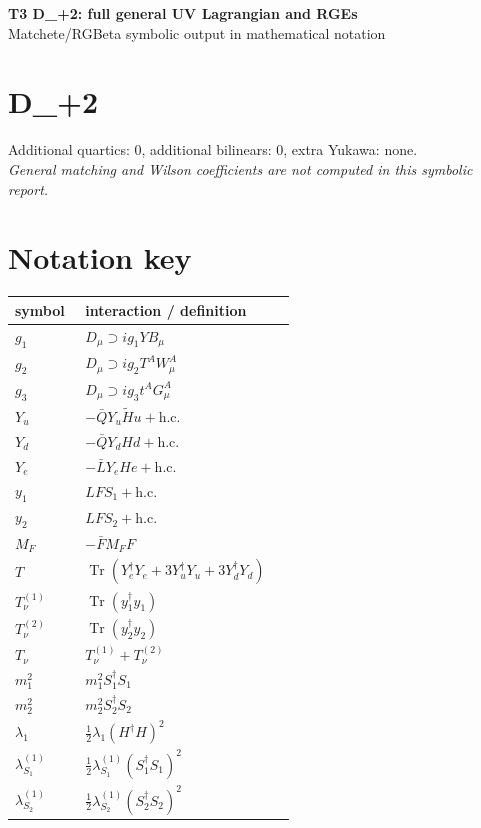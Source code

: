 \documentclass[10pt,a4paper]{article}
\begin{document}
\begin{center}
{\Large\bfseries T3 D\_+2: full general UV Lagrangian and RGEs}\\[4pt]
Matchete/RGBeta symbolic output in mathematical notation
\end{center}
\bigskip
\section*{D\_+2}
Additional quartics: 0, additional bilinears: 0, extra Yukawa: none.\\
\emph{General matching and Wilson coefficients are not computed in this symbolic report.}
\section*{Notation key}
\begin{longtable}{@{}p{0.23\linewidth}p{0.69\linewidth}@{}}
\toprule
symbol & interaction / definition \\
\midrule
$g_1$ & $D_\mu\supset i g_1YB_\mu$ \\
$g_2$ & $D_\mu\supset i g_2T^AW_\mu^A$ \\
$g_3$ & $D_\mu\supset i g_3t^AG_\mu^A$ \\
$Y_u$ & $-\bar QY_u\widetilde Hu+\mathrm{h.c.}$ \\
$Y_d$ & $-\bar QY_dHd+\mathrm{h.c.}$ \\
$Y_e$ & $-\bar LY_eHe+\mathrm{h.c.}$ \\
$y_1$ & $LFS_1+\mathrm{h.c.}$ \\
$y_2$ & $LFS_2+\mathrm{h.c.}$ \\
$M_F$ & $-\bar FM_FF$ \\
$T$ & $\operatorname{Tr}(Y_e^\dagger Y_e+3Y_u^\dagger Y_u+3Y_d^\dagger Y_d)$ \\
$T_\nu^{(1)}$ & $\operatorname{Tr}(y_1^\dagger y_1)$ \\
$T_\nu^{(2)}$ & $\operatorname{Tr}(y_2^\dagger y_2)$ \\
$T_\nu$ & $T_\nu^{(1)}+T_\nu^{(2)}$ \\
$m_1^2$ & $m_1^2S_1^\dagger S_1$ \\
$m_2^2$ & $m_2^2S_2^\dagger S_2$ \\
$\lambda_1$ & $\frac12\lambda_1(H^\dagger H)^2$ \\
$\lambda_{S_1}^{(1)}$ & $\frac12\lambda_{S_1}^{(1)}(S_1^\dagger S_1)^2$ \\
$\lambda_{S_2}^{(1)}$ & $\frac12\lambda_{S_2}^{(1)}(S_2^\dagger S_2)^2$ \\

\end{longtable}
\end{document}
